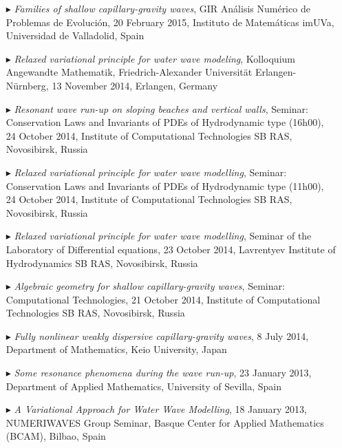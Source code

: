 \begin{itemize}
  \item[$\blacktriangleright$] \textit{Families of shallow capillary-gravity waves}, GIR An\'alisis Num\'erico de Problemas de Evoluci\'on, 20 February 2015, Instituto de Matem\'aticas imUVa, Universidad de Valladolid, Spain

  \item[$\blacktriangleright$] \textit{Relaxed variational principle for water wave modeling}, Kolloquium Angewandte Mathematik, Friedrich-Alexander Universit\"at Erlangen-N\"urnberg, 13 November 2014, Erlangen, Germany

  \item[$\blacktriangleright$] \textit{Resonant wave run-up on sloping beaches and vertical walls}, Seminar: Conservation Laws and Invariants of PDEs of Hydrodynamic type (16h00), 24 October 2014, Institute of Computational Technologies SB RAS, Novosibirsk, Russia
  
  \item[$\blacktriangleright$] \textit{Relaxed variational principle for water wave modelling}, Seminar: Conservation Laws and Invariants of PDEs of Hydrodynamic type (11h00), 24 October 2014, Institute of Computational Technologies SB RAS, Novosibirsk, Russia
  
  \item[$\blacktriangleright$] \textit{Relaxed variational principle for water wave modelling}, Seminar of the Laboratory of Differential equations, 23 October 2014, Lavrentyev Institute of Hydrodynamics SB RAS, Novosibirsk, Russia
  
  \item[$\blacktriangleright$] \textit{Algebraic geometry for shallow capillary-gravity waves}, Seminar: Computational Technologies, 21 October 2014, Institute of Computational Technologies SB RAS, Novosibirsk, Russia

  \item[$\blacktriangleright$] \textit{Fully nonlinear weakly dispersive capillary-gravity waves}, 8 July 2014, Department of Mathematics, Keio University, Japan

  \item[$\blacktriangleright$] \textit{Some resonance phenomena during the wave run-up}, 23 January 2013, Department of Applied Mathematics, University of Sevilla, Spain

  \item[$\blacktriangleright$] \textit{A Variational Approach for Water Wave Modelling}, 18 January 2013, NUMERIWAVES Group Seminar, Basque Center for Applied Mathematics (BCAM), Bilbao, Spain


\end{itemize}
